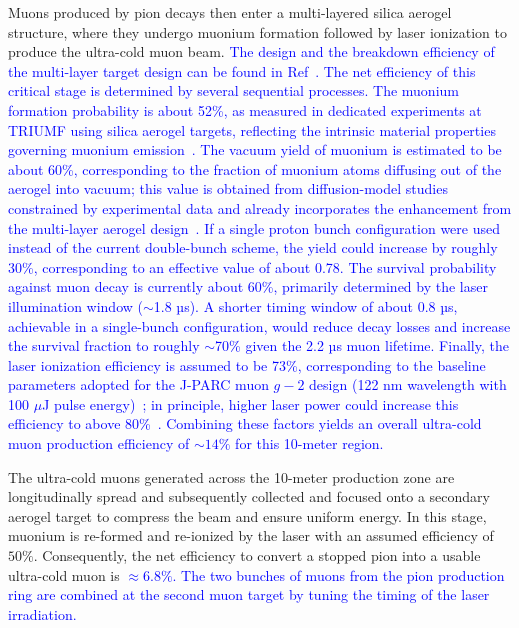 \documentclass[a4paper,11pt]{article}
\begin{document}
Muons produced by pion decays then enter a multi-layered silica aerogel structure, where they undergo muonium formation followed by laser ionization to produce the ultra-cold muon beam. \textcolor{blue}{The design and the breakdown efficiency of the multi-layer target design can be found in Ref~\cite{Zhang:2022ilj}. The net efficiency of this critical stage is determined by several sequential processes. The muonium formation probability is about 52\%, as measured in dedicated experiments at TRIUMF using silica aerogel targets, reflecting the intrinsic material properties governing muonium emission~\cite{Bakule:2013poa, Beer:2014ooa}. The vacuum yield of muonium is estimated to be about 60\%, corresponding to the fraction of muonium atoms diffusing out of the aerogel into vacuum; this value is obtained from diffusion-model studies constrained by experimental data and already incorporates the enhancement from the multi-layer aerogel design~\cite{Zhang:2022ilj}. If a single proton bunch configuration were used instead of the current double-bunch scheme, the yield could increase by roughly 30\%, corresponding to an effective value of about 0.78. The survival probability against muon decay is currently about 60\%, primarily determined by the laser illumination window ($\sim$1.8 µs). A shorter timing window of about 0.8 µs, achievable in a single-bunch configuration, would reduce decay losses and increase the survival fraction to roughly $\sim$70\% given the 2.2 µs muon lifetime. Finally, the laser ionization efficiency is assumed to be 73\%, corresponding to the baseline parameters adopted for the J-PARC muon $g\!-\!2$ design (122 nm wavelength with 100 $\mu$J pulse energy)~\cite{Abe:2019thb}; in principle, higher laser power could increase this efficiency to above 80\%~\cite{Zhang:2022ilj}. Combining these factors yields an overall ultra-cold muon production efficiency of $\sim14\%$ for this 10-meter region.}

The ultra-cold muons generated across the 10-meter production zone are longitudinally spread and subsequently collected and focused onto a secondary aerogel target to compress the beam and ensure uniform energy. In this stage, muonium is re-formed and re-ionized by the laser with an assumed efficiency of $50\%$. Consequently, the net efficiency to convert a stopped pion into a usable ultra-cold muon is \textcolor{blue}{$\approx 6.8\%$. The two bunches of muons from the pion production ring are combined at the second muon target by tuning the timing of the laser irradiation. }
\end{document}
